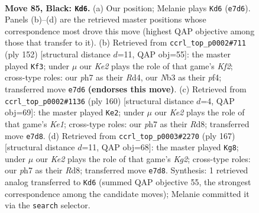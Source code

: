 \documentclass[11pt]{article}
\begin{document}
\clearpage

\begin{figure}[p]\centering
\begin{subfigure}{0.46\textwidth}\centering
\resizebox{\linewidth}{!}{%
\newchessgame
\chessboard[
  setfen={8/R3k2P/6p1/5p2/5P2/1n3K2/8/8 b - - 4 85},
  showmover=false,
  pgfstyle=straightmove, color=movearrow, markmove={e7-d6}
]}
\caption{}
\end{subfigure}\hfill
\begin{subfigure}{0.46\textwidth}\centering
\resizebox{\linewidth}{!}{%
\newchessgame
\chessboard[
  setfen={8/5pk1/8/5PP1/3R1p2/8/r4K2/8 w - - 1 77},
  showmover=false,
  pgfstyle=straightmove, color=movearrow, markmove={f2-f3}
]}
\caption{}
\end{subfigure}
\\[4pt]
\begin{subfigure}{0.46\textwidth}\centering
\resizebox{\linewidth}{!}{%
\newchessgame
\chessboard[
  setfen={3R4/8/6k1/6p1/6P1/5P2/8/r3K3 w - - 61 81},
  showmover=false,
  pgfstyle=straightmove, color=movearrow, markmove={e1-e2}
]}
\caption{}
\end{subfigure}\hfill
\begin{subfigure}{0.46\textwidth}\centering
\resizebox{\linewidth}{!}{%
\newchessgame
\chessboard[
  setfen={3r4/2R3k1/8/7p/8/6PK/8/8 b - - 9 84},
  showmover=false,
  pgfstyle=straightmove, color=movearrow, markmove={g7-g8}
]}
\caption{}
\end{subfigure}
\caption{\textbf{Move 85, Black: \texttt{Kd6}.} (a) Our position; Melanie plays \texttt{Kd6} (\texttt{e7d6}). Panels (b)--(d) are the retrieved master positions whose correspondence most drove this move (highest QAP objective among those that transfer to it). (b) Retrieved from \texttt{ccrl\_top\_p0002\#711} (ply 152) [structural distance $d$=11, QAP obj=55]: the master played \texttt{Kf3}; under $\mu$ our \emph{Ke2} plays the role of that game's \emph{Kf2}; cross-type roles: our \emph{p}h7 as their \emph{R}d4, our \emph{N}b3 as their \emph{p}f4; transferred move \texttt{e7d6} \textbf{(endorses this move)}. (c) Retrieved from \texttt{ccrl\_top\_p0002\#1136} (ply 160) [structural distance $d$=4, QAP obj=69]: the master played \texttt{Ke2}; under $\mu$ our \emph{Ke2} plays the role of that game's \emph{Ke1}; cross-type roles: our \emph{p}h7 as their \emph{R}d8; transferred move \texttt{e7d8}. (d) Retrieved from \texttt{ccrl\_top\_p0003\#2270} (ply 167) [structural distance $d$=11, QAP obj=68]: the master played \texttt{Kg8}; under $\mu$ our \emph{Ke2} plays the role of that game's \emph{Kg2}; cross-type roles: our \emph{p}h7 as their \emph{R}d8; transferred move \texttt{e7d8}. Synthesis: 1 retrieved analog transferred to \texttt{Kd6} (summed QAP objective 55, the strongest correspondence among the candidate moves); Melanie committed it via the \texttt{search} selector.}
\label{fig:thought-m169}
\end{figure}
\end{document}
